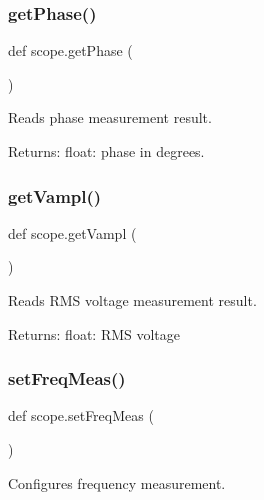 \subsubsection{\texorpdfstring{get\+Phase()}{getPhase()}}
{\footnotesize\ttfamily def scope.\+get\+Phase (\begin{DoxyParamCaption}{ }\end{DoxyParamCaption})}

\begin{DoxyVerb}Reads phase measurement result.

Returns:
    float: phase in degrees.\end{DoxyVerb}
 \mbox{\label{namespacescope_a8124d99f9c980428b66eb5901cf6c916}} 
\subsubsection{\texorpdfstring{get\+Vampl()}{getVampl()}}
{\footnotesize\ttfamily def scope.\+get\+Vampl (\begin{DoxyParamCaption}{ }\end{DoxyParamCaption})}

\begin{DoxyVerb}Reads RMS voltage measurement result.

Returns:
    float: RMS voltage\end{DoxyVerb}
 \mbox{\label{namespacescope_a0a7d4a4f6d99ecebaa7bb1e1646ce872}} 
\subsubsection{\texorpdfstring{set\+Freq\+Meas()}{setFreqMeas()}}
{\footnotesize\ttfamily def scope.\+set\+Freq\+Meas (\begin{DoxyParamCaption}{ }\end{DoxyParamCaption})}

\begin{DoxyVerb}Configures frequency measurement.
\end{DoxyVerb}
 \mbox{\label{namespacescope_a130065205e900c334beba78e350223d8}} 

